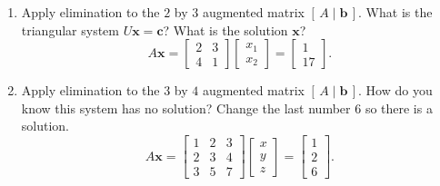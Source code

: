 \documentclass[14pt, a4paper]{article}
\begin{document}
\begin{enumerate}[resume]

    \item Apply elimination to the $2$ by $3$ augmented matrix $[\,A \mid \boldsymbol{b}\,]$. What is the triangular system $U\boldsymbol{x} = \boldsymbol{c}$? What is the solution $\boldsymbol{x}$?
          \[
              A\boldsymbol{x} =
              \begin{bmatrix}
                  2 & 3 \\
                  4 & 1
              \end{bmatrix}
              \begin{bmatrix}
                  x_1 \\ x_2
              \end{bmatrix}
              =
              \begin{bmatrix}
                  1 \\ 17
              \end{bmatrix}.
          \]

    \item Apply elimination to the $3$ by $4$ augmented matrix $[\,A \mid \boldsymbol{b}\,]$. How do you know this system has no solution? Change the last number $6$ so there is a solution.
          \[
              A\boldsymbol{x} =
              \begin{bmatrix}
                  1 & 2 & 3 \\
                  2 & 3 & 4 \\
                  3 & 5 & 7
              \end{bmatrix}
              \begin{bmatrix}
                  x \\ y \\ z
              \end{bmatrix}
              =
              \begin{bmatrix}
                  1 \\ 2 \\ 6
              \end{bmatrix}.
          \]


\end{enumerate}
\end{document}
